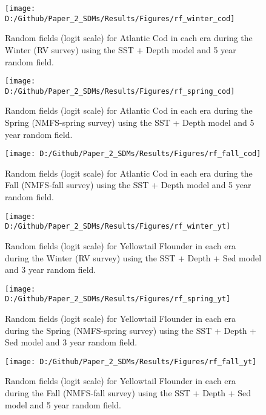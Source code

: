 \documentclass[
]{article}
\begin{document}
\begin{landscape}
\begin{figure}
\texttt{[image: D:/Github/Paper\_2\_SDMs/Results/Figures/rf\_winter\_cod]} \caption{Random fields (logit scale) for Atlantic Cod  in each era during the Winter (RV survey) using the SST + Depth model and 5 year random field.}\label{fig:rf-winter-cod}
\end{figure}

\newpage
\begin{figure}
\texttt{[image: D:/Github/Paper\_2\_SDMs/Results/Figures/rf\_spring\_cod]} \caption{Random fields (logit scale) for Atlantic Cod  in each era during the Spring (NMFS-spring survey) using the SST + Depth model and 5 year random field.}\label{fig:rf-spring-cod}
\end{figure}

\newpage
\begin{figure}
\texttt{[image: D:/Github/Paper\_2\_SDMs/Results/Figures/rf\_fall\_cod]} \caption{Random fields (logit scale) for Atlantic Cod  in each era during the Fall (NMFS-fall survey) using the SST + Depth model and 5 year random field.}\label{fig:rf-fall-cod}
\end{figure}

\newpage
\begin{figure}
\texttt{[image: D:/Github/Paper\_2\_SDMs/Results/Figures/rf\_winter\_yt]} \caption{Random fields (logit scale) for Yellowtail Flounder in each era during the Winter (RV survey) using the SST + Depth + Sed model and 3 year random field.}\label{fig:rf-winter-yt}
\end{figure}

\newpage
\begin{figure}
\texttt{[image: D:/Github/Paper\_2\_SDMs/Results/Figures/rf\_spring\_yt]} \caption{Random fields (logit scale) for Yellowtail Flounder in each era during the Spring (NMFS-spring survey) using the SST + Depth + Sed model and 3 year random field.}\label{fig:rf-spring-yt}
\end{figure}

\newpage
\begin{figure}
\texttt{[image: D:/Github/Paper\_2\_SDMs/Results/Figures/rf\_fall\_yt]} \caption{Random fields (logit scale) for Yellowtail Flounder in each era during the Fall (NMFS-fall survey) using the SST + Depth + Sed model and 5 year random field.}\label{fig:rf-fall-yt}
\end{figure}


\end{landscape}
\end{document}
